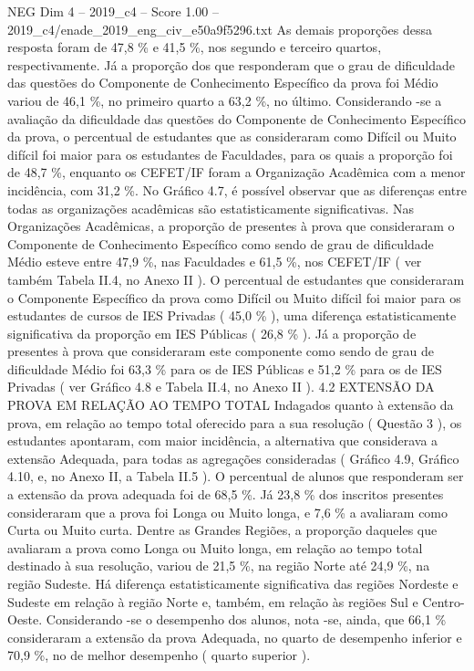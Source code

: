 \begin{textsample}{NEG Dim 4 – 2019\_c4 – Score 1.00 – 2019\_c4/enade\_2019\_eng\_civ\_e50a9f5296.txt}
As demais proporções dessa resposta foram de 47,8 \% e 41,5 \%, nos segundo e terceiro quartos, respectivamente.
Já a proporção dos que responderam que o grau de dificuldade das questões do Componente de Conhecimento Específico da prova foi Médio variou de 46,1 \%, no primeiro quarto a 63,2 \%, no último.
Considerando -se a avaliação da dificuldade das questões do Componente de Conhecimento Específico da prova, o percentual de estudantes que as consideraram como Difícil ou Muito difícil foi maior para os estudantes de Faculdades, para os quais a proporção foi de 48,7 \%, enquanto os CEFET/IF foram a Organização Acadêmica com a menor incidência, com 31,2 \%.
No Gráfico 4.7, é possível observar que as diferenças entre todas as organizações acadêmicas são estatisticamente significativas.
Nas Organizações Acadêmicas, a proporção de presentes à prova que consideraram o Componente de Conhecimento Específico como sendo de grau de dificuldade Médio esteve entre 47,9 \%, nas Faculdades e 61,5 \%, nos CEFET/IF ( ver também Tabela II.4, no Anexo II ).
O percentual de estudantes que consideraram o Componente Específico da prova como Difícil ou Muito difícil foi maior para os estudantes de cursos de IES Privadas ( 45,0 \% ), uma diferença estatisticamente significativa da proporção em IES Públicas ( 26,8 \% ).
Já a proporção de presentes à prova que consideraram este componente como sendo de grau de dificuldade Médio foi 63,3 \% para os de IES Públicas e 51,2 \% para os de IES Privadas ( ver Gráfico 4.8 e Tabela II.4, no Anexo II ). 4.2 EXTENSÃO DA PROVA EM RELAÇÃO AO TEMPO TOTAL Indagados quanto à extensão da prova, em relação ao tempo total oferecido para a sua resolução ( Questão 3 ), os estudantes apontaram, com maior incidência, a alternativa que considerava a extensão Adequada, para todas as agregações consideradas ( Gráfico 4.9, Gráfico 4.10, e, no Anexo II, a Tabela II.5 ).
O percentual de alunos que responderam ser a extensão da prova adequada foi de 68,5 \%.
Já 23,8 \% dos inscritos presentes consideraram que a prova foi Longa ou Muito longa, e 7,6 \% a avaliaram como Curta ou Muito curta.
Dentre as Grandes Regiões, a proporção daqueles que avaliaram a prova como Longa ou Muito longa, em relação ao tempo total destinado à sua resolução, variou de 21,5 \%, na região Norte até 24,9 \%, na região Sudeste.
Há diferença estatisticamente significativa das regiões Nordeste e Sudeste em relação à região Norte e, também, em relação às regiões Sul e Centro-Oeste.
Considerando -se o desempenho dos alunos, nota -se, ainda, que 66,1 \% consideraram a extensão da prova Adequada, no quarto de desempenho inferior e 70,9 \%, no de melhor desempenho ( quarto superior ).

\end{textsample}
